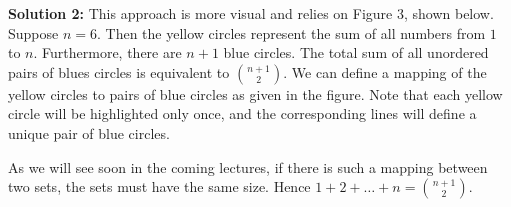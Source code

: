 \documentclass{article}
\begin{document}
    \textbf{Solution 2:} This approach is more visual and relies on Figure 3, shown below. Suppose $n = 6$. Then the yellow circles represent the sum of all numbers from $1$ to $n$. Furthermore, there are $n + 1$ blue circles. The total sum of all unordered pairs of blues circles is equivalent to $\binom{n + 1}{2}$. We can define a mapping of the yellow circles to pairs of blue circles as given in the figure. Note that each yellow circle will be highlighted only once, and the corresponding lines will define a unique pair of blue circles.
    
    \vspace{1.5mm}
    As we will see soon in the coming lectures, if there is such a mapping between two sets, the sets must have the same size. Hence $1 + 2 + \dots + n = \binom{n + 1}{2}$.
    
\end{document}
